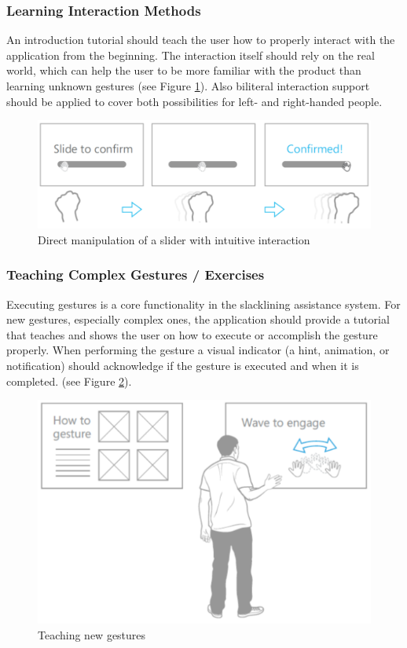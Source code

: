 \subsubsection{Learning Interaction Methods}
An introduction tutorial should teach the user how to properly interact with the application from the beginning. The interaction itself should rely on the real world, which can help the user to be more familiar with the product than learning unknown gestures (see Figure \ref{fig:hciGuidelinesDynamicGesture}). Also biliteral interaction support should be applied to cover both possibilities for left- and right-handed people.
\begin{figure}[htb]
	\centering
	\begin{minipage}[t]{1\linewidth}
		\centering
		\includegraphics[width=0.75\linewidth]{Pictures/hciGuidelinesDynamicGesture}
		\caption{Direct manipulation of a slider with intuitive interaction~\cite{MicrosoftHIG2014-mh}}
		\label{fig:hciGuidelinesDynamicGesture}
	\end{minipage}
\end{figure}

\subsubsection{Teaching Complex Gestures / Exercises}
Executing gestures is a core functionality in the slacklining assistance system. For new gestures, especially complex ones, the application should provide a tutorial that teaches and shows the user on how to execute or accomplish the gesture properly. When performing the gesture a visual indicator (a hint, animation, or notification) should acknowledge if the gesture is executed and when it is completed. (see Figure \ref{fig:hciGuidelinesTeachingMethods}).
\begin{figure}[htb]
	\centering
	\begin{minipage}[t]{1\linewidth}
		\centering
		\includegraphics[width=0.65\linewidth]{Pictures/hciGuidelinesTeachingMethods}
		\caption{Teaching new gestures~\cite{MicrosoftHIG2014-mh}}
		\label{fig:hciGuidelinesTeachingMethods}
	\end{minipage}
\end{figure}

